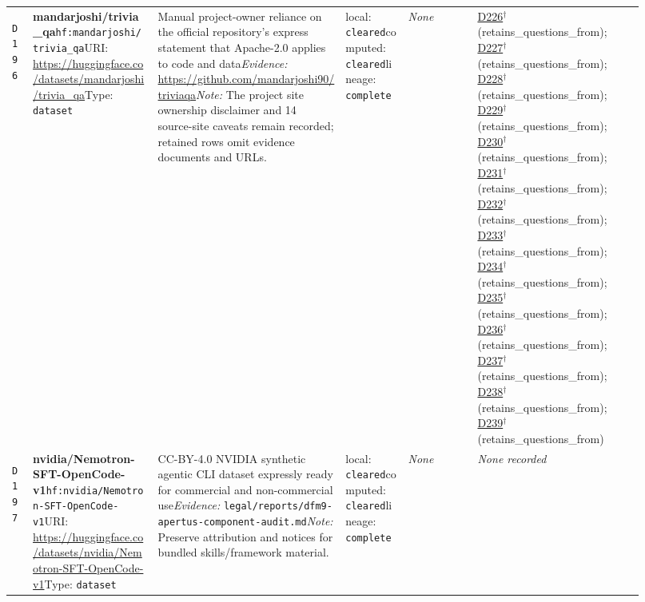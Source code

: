 \documentclass[9pt,a4paper]{article}
\newcommand{\depid}[1]{\hypertarget{dep:#1}{\texttt{#1}}}
\begin{document}
\begin{landscape}
\begin{longtable}{@{}L{0.035\linewidth}L{0.185\linewidth}L{0.27\linewidth}L{0.09\linewidth}L{0.10\linewidth}L{0.24\linewidth}@{}}
\depid{D196} & \textbf{mandarjoshi/trivia\_qa}\newline \nolinkurl{hf:mandarjoshi/trivia_qa}\newline URI: \url{https://huggingface.co/datasets/mandarjoshi/trivia_qa}\newline Type: \texttt{dataset} & Manual project-owner reliance on the official repository's express statement that Apache-2.0 applies to code and data\newline \textit{Evidence:} \url{https://github.com/mandarjoshi90/triviaqa}\newline \textit{Note:} The project site ownership disclaimer and 14 source-site caveats remain recorded; retained rows omit evidence documents and URLs. & local: \texttt{cleared}\newline computed: \texttt{cleared}\newline lineage: \texttt{complete} & \textit{None} & \hyperlink{dep:D226}{D226}$^{\dagger}$ (retains\_questions\_from); \hyperlink{dep:D227}{D227}$^{\dagger}$ (retains\_questions\_from); \hyperlink{dep:D228}{D228}$^{\dagger}$ (retains\_questions\_from); \hyperlink{dep:D229}{D229}$^{\dagger}$ (retains\_questions\_from); \hyperlink{dep:D230}{D230}$^{\dagger}$ (retains\_questions\_from); \hyperlink{dep:D231}{D231}$^{\dagger}$ (retains\_questions\_from); \hyperlink{dep:D232}{D232}$^{\dagger}$ (retains\_questions\_from); \hyperlink{dep:D233}{D233}$^{\dagger}$ (retains\_questions\_from); \hyperlink{dep:D234}{D234}$^{\dagger}$ (retains\_questions\_from); \hyperlink{dep:D235}{D235}$^{\dagger}$ (retains\_questions\_from); \hyperlink{dep:D236}{D236}$^{\dagger}$ (retains\_questions\_from); \hyperlink{dep:D237}{D237}$^{\dagger}$ (retains\_questions\_from); \hyperlink{dep:D238}{D238}$^{\dagger}$ (retains\_questions\_from); \hyperlink{dep:D239}{D239}$^{\dagger}$ (retains\_questions\_from) \\
\depid{D197} & \textbf{nvidia/Nemotron-SFT-OpenCode-v1}\newline \nolinkurl{hf:nvidia/Nemotron-SFT-OpenCode-v1}\newline URI: \url{https://huggingface.co/datasets/nvidia/Nemotron-SFT-OpenCode-v1}\newline Type: \texttt{dataset} & CC-BY-4.0 NVIDIA synthetic agentic CLI dataset expressly ready for commercial and non-commercial use\newline \textit{Evidence:} \nolinkurl{legal/reports/dfm9-apertus-component-audit.md}\newline \textit{Note:} Preserve attribution and notices for bundled skills/framework material. & local: \texttt{cleared}\newline computed: \texttt{cleared}\newline lineage: \texttt{complete} & \textit{None} & \textit{None recorded} \\

\end{longtable}
\end{landscape}
\end{document}

